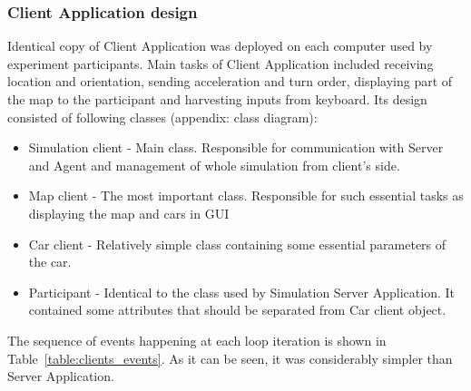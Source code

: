 \documentclass[11pt,english]{article}
\begin{document}
\subsubsection{Client Application design}


Identical copy of Client Application was deployed on  each computer used by experiment participants. Main tasks of Client Application included receiving location and orientation, sending acceleration and turn order, displaying part of the map to the participant and harvesting inputs from keyboard. Its design consisted of following classes (appendix: class diagram):

\begin{itemize}
\item Simulation client - Main class. Responsible for communication with Server and Agent and management of whole simulation from client's side. 
\item Map client - The most important class. Responsible for such essential tasks as displaying the map and cars in GUI
\item Car client - Relatively simple class containing some essential parameters of the car. 
\item Participant - Identical to the class used by Simulation Server Application. It contained some attributes that should be separated from Car client object.
\end{itemize}


The sequence of events happening at each loop iteration is shown in Table~\ref{table:clients_events}. As it can be seen, it was considerably simpler than Server Application. 
\end{document}
